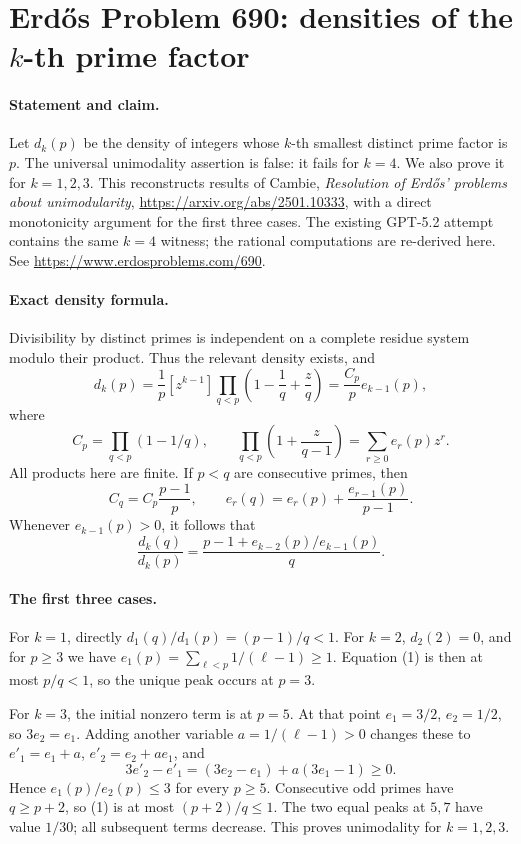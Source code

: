\section*{Erd\H{o}s Problem 690: densities of the \(k\)-th prime factor}

\paragraph{Statement and claim.}
Let \(d_k(p)\) be the density of integers whose \(k\)-th smallest
distinct prime factor is \(p\). The universal unimodality assertion
is false: it fails for \(k=4\). We also prove it for \(k=1,2,3\).
This reconstructs results of Cambie,
\emph{Resolution of Erd\H{o}s' problems about unimodularity},
\url{https://arxiv.org/abs/2501.10333}, with a direct monotonicity
argument for the first three cases.
The existing GPT-5.2 attempt contains the same \(k=4\) witness;
the rational computations are re-derived here.
See \url{https://www.erdosproblems.com/690}.

\paragraph{Exact density formula.}
Divisibility by distinct primes is independent on a complete
residue system modulo their product. Thus the relevant density
exists, and
\[
 d_k(p)=\frac1p[z^{k-1}]
       \prod_{q<p}\left(1-\frac1q+\frac zq\right)
       =\frac{C_p}{p}e_{k-1}(p),
\]
where
\[
 C_p=\prod_{q<p}(1-1/q),\qquad
 \prod_{q<p}\left(1+\frac z{q-1}\right)
   =\sum_{r\geq0}e_r(p)z^r.
\]
All products here are finite. If \(p<q\) are consecutive primes,
then
\[
 C_q=C_p\frac{p-1}{p},\qquad
 e_r(q)=e_r(p)+\frac{e_{r-1}(p)}{p-1}.
\]
Whenever \(e_{k-1}(p)>0\), it follows that
\[
 \frac{d_k(q)}{d_k(p)}
   =\frac{p-1+e_{k-2}(p)/e_{k-1}(p)}q.                         \tag{1}
\]

\paragraph{The first three cases.}
For \(k=1\), directly \(d_1(q)/d_1(p)=(p-1)/q<1\).
For \(k=2\), \(d_2(2)=0\), and for \(p\geq3\) we have
\(e_1(p)=\sum_{\ell<p}1/(\ell-1)\geq1\).
Equation (1) is then at most \(p/q<1\), so the unique peak
occurs at \(p=3\).

For \(k=3\), the initial nonzero term is at \(p=5\).
At that point \(e_1=3/2\), \(e_2=1/2\), so \(3e_2=e_1\).
Adding another variable \(a=1/(\ell-1)>0\) changes these to
\(e'_1=e_1+a\), \(e'_2=e_2+ae_1\), and
\[
 3e'_2-e'_1=(3e_2-e_1)+a(3e_1-1)\geq0.
\]
Hence \(e_1(p)/e_2(p)\leq3\) for every \(p\geq5\).
Consecutive odd primes have \(q\geq p+2\), so (1) is at most
\((p+2)/q\leq1\). The two equal peaks at \(5,7\) have value
\(1/30\); all subsequent terms decrease. This proves unimodality
for \(k=1,2,3\).

